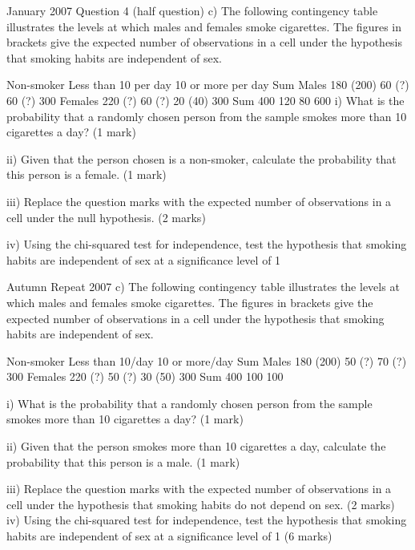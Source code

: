 January 2007 Question 4 (half question)
c) The following contingency table illustrates the levels at which males and females smoke cigarettes. The figures in brackets give the expected number of observations in a cell under the hypothesis that smoking habits are independent of sex.

	Non-smoker	Less than 10 per day	10 or more per day	Sum
Males	180 (200)	60 (?)	60 (?)	300
Females	220 (?)	60 (?)	20 (40)	300
Sum	400	120	80	600
i) What is the probability that a randomly chosen person from the sample smokes more than 10 cigarettes a day?                                                                    (1 mark) 

ii) Given that the person chosen is a non-smoker, calculate the probability that this person is a female.                                                                                       (1 mark)

iii) Replace the question marks with the expected number of observations in a cell under the null hypothesis.                                                                          (2 marks) 

iv) Using the chi-squared test for independence, test the hypothesis that smoking habits are independent of sex at a significance level of 1%

Autumn Repeat 2007
c) The following contingency table illustrates the levels at which males and females smoke cigarettes. The figures in brackets give the expected number of observations in a cell under the hypothesis that smoking habits are independent of sex.

	Non-smoker	Less than 10/day	10 or more/day	Sum
Males	180 (200)	50 (?)	70 (?)	300
Females	220 (?)	50 (?)	30 (50)	300
Sum	400	100	100	

i)	What is the probability that a randomly chosen person from the sample smokes more than 10 cigarettes a day? 
(1 mark)

ii)	Given that the person smokes more than 10 cigarettes a day, calculate the probability that this person is a male.
(1 mark)

iii)	Replace the question marks with the expected number of observations in a cell under the hypothesis that smoking habits do not depend on sex. 
(2 marks)
iv)	Using the chi-squared test for independence, test the hypothesis that smoking habits are independent of sex at a significance level of 1%
(6 marks)


